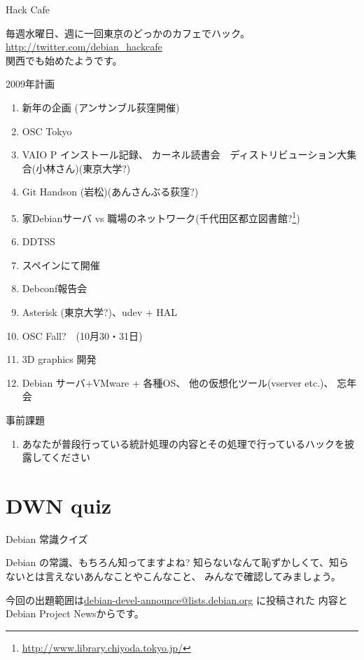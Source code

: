 \begin{frame}{Hack Cafe}

毎週水曜日、週に一回東京のどっかのカフェでハック。\\
\url{http://twitter.com/debian_hackcafe}\\
関西でも始めたようです。
\end{frame}

\begin{frame}{2009年計画}

{\scriptsize
 \begin{enumerate}
  \item 新年の企画 (アンサンブル荻窪開催)
  \item OSC Tokyo
  \item VAIO P インストール記録、
	カーネル読書会　ディストリビューション大集合(小林さん)(東京大学?)
  \item Git Handson (岩松)(あんさんぶる荻窪?)
  \item 家Debianサーバ vs 職場のネットワーク(千代田区都立図書館?\footnote{\url{http://www.library.chiyoda.tokyo.jp/}})
  \item DDTSS 
  \item スペインにて開催
  \item Debconf報告会
  \item Asterisk (東京大学?)、udev + HAL
  \item OSC Fall?　(10月30・31日)
  \item 3D graphics 開発 
  \item Debian サーバ+VMware + 各種OS、
	他の仮想化ツール(vserver etc.)、
	忘年会
 \end{enumerate}
}
\end{frame}


\begin{frame}{事前課題}
\begin{enumerate}
 \item あなたが普段行っている統計処理の内容とその処理で行っているハックを披露してください
\end{enumerate}
\end{frame}

{\footnotesize

}


\section{DWN quiz}
\begin{frame}{Debian 常識クイズ}

Debian の常識、もちろん知ってますよね?
知らないなんて恥ずかしくて、知らないとは言えないあんなことやこんなこと、
みんなで確認してみましょう。

今回の出題範囲は\url{debian-devel-announce@lists.debian.org} に投稿された
内容とDebian Project Newsからです。

\end{frame}

